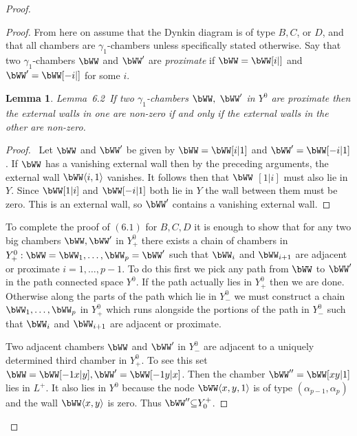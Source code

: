 \documentclass{memo-l}
\newtheorem{lemma}[theorem]{Lemma}
\theoremstyle{definition}
\theoremstyle{remark}
\numberwithin{section}{chapter}
\numberwithin{equation}{chapter}
\begin{document}
\begin{proof}
\begin{proof}
   From here on assume that the Dynkin diagram is of type $B, C$, or $D$,
and that all chambers are ${\gamma}_{1}$-chambers unless specifically
stated otherwise.  Say that two ${\gamma}_{1}$-chambers $\bWW$
and $\bWW'$ are {\it proximate} if
$\bWW=\bWW[i\vert ]$ and
$\bWW' =   \bWW[-i\vert ]$ for some $i$.

\medpagebreak

\begin{lemma}{Lemma\ 6.2}\ If two ${\gamma}_{1}$-chambers $\bWW,$
$\bWW'$ in $Y^{0}$ are proximate then the external walls in one are
non-zero if and only if the external walls in the other are non-zero.
\end{lemma}

\medpagebreak

\begin{proof} \ Let $\bWW$ and $\bWW'$ be given by $\bWW
= \bWW[i\vert 1]$ and $\bWW'=\bWW[-i\vert 1]$.  If
$\bWW$ has a vanishing external wall then by the preceding arguments,
the external wall $\bWW\langle i,1\rangle $ vanishes.  It follows then that $\bWW$
$[1\vert i]$ must also lie in $Y$.  Since $\bWW[1\vert i]$
and $\bWW[-i\vert 1]$ both lie in $Y$ the wall between them must be zero.  This
is an external wall, so $\bWW'$ contains a vanishing
external wall.
\end{proof}


{\medskip}



   To complete the proof of $(6.1)$ for $B, C, D$ it is enough to show that
for any two big chambers $\bWW , \bWW '$ in $Y_{+}^{0}$ there exists a
chain of chambers in $Y_{+}^{0}: \bWW = \bWW _{1},\ldots, \bWW _{p}=
\bWW '$ such that $\bWW _{i}$ and $\bWW _{i+1}$ are adjacent or
proximate $i=1,\ldots ,p-1$.  To do this first we pick any path from
$\bWW$ to $\bWW '$ in the path connected space $Y^{0}$.  If the path actually
lies in $Y^{0}_{+}$ then we are done.  Otherwise along the parts of the
path which lie in $Y^{0}_{-}$ we must construct a chain $\bWW _{1},\ldots,
\bWW _{p}$ in $Y^{0}_{+}$ which runs alongside the portions of the path
in $Y^{0}_{-}$ such that $\bWW _{i}$ and $\bWW _{i+1}$ are adjacent or
proximate.

   Two adjacent chambers $\bWW$ and $\bWW'$ in $Y_{-}^{0}$ are
adjacent to a uniquely determined third chamber in $Y_{+}^{0}$.  To see
this set $\bWW = \bWW[-1x\vert y], \bWW' = \bWW[-1y\vert x]$.
Then the chamber $\bWW'' = \bWW[xy\vert 1]$ lies in $L^{+}$.  It also
lies in $Y^{0}$ because the node $\bWW \langle x,y,1\rangle $ is of type
$({\alpha}_{p-1},{\alpha}_{p})$ and the wall $\bWW \langle x,y\rangle $ is zero.  Thus
$\bWW'' {\subseteq} Y_{0}^{+}$.


\end{proof}
\end{proof}
\end{document}
